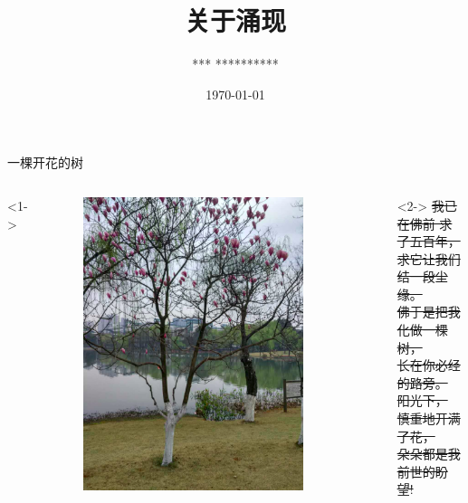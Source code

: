 \documentclass{beamer}
\title[系统科学与工程讨论课]{
  \erhao 关于涌现}
\author[***]{
  ***{ }**********}
\institute[\yihao\fontspec{LHANDW.TTF}ACEE]{\sihao {数学科学学院统计学}}
\date[\today]{
  \today \\
  }
\begin{document}
\begin{frame}
  \titlepage
\end{frame}

\begin{frame}{一棵开花的树}
	\begin{columns}
		<1->
		\begin{figure}[H]
			\includegraphics[width=0.85\textwidth]{tree.png}
		\end{figure}
		<2->
	\sout{我已在佛前 求了五百年，\\
	求它让我们结一段尘缘。\\
	佛于是把我化做一棵树，\\
	长在你必经的路旁。\\
	阳光下，\\
	慎重地开满了花，\\
	朵朵都是我前世的盼望!}
	\end{columns}
\end{frame}
\end{document}
